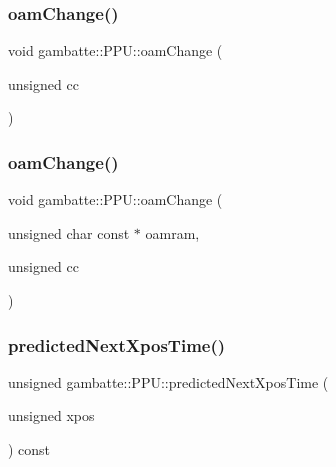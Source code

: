 \subsubsection{\texorpdfstring{oam\+Change()}{oamChange()}\hspace{0.1cm}{\footnotesize\ttfamily [1/2]}}
{\footnotesize\ttfamily void gambatte\+::\+P\+P\+U\+::oam\+Change (\begin{DoxyParamCaption}\item[{unsigned}]{cc }\end{DoxyParamCaption})\hspace{0.3cm}{\ttfamily [inline]}}

\mbox{\label{classgambatte_1_1PPU_a5c1f4b8784c8303e0f3af5bbc27751a5}} 
\subsubsection{\texorpdfstring{oam\+Change()}{oamChange()}\hspace{0.1cm}{\footnotesize\ttfamily [2/2]}}
{\footnotesize\ttfamily void gambatte\+::\+P\+P\+U\+::oam\+Change (\begin{DoxyParamCaption}\item[{unsigned char const $\ast$}]{oamram,  }\item[{unsigned}]{cc }\end{DoxyParamCaption})\hspace{0.3cm}{\ttfamily [inline]}}

\mbox{\label{classgambatte_1_1PPU_ad8d55b06d78e952bed556cf3e51c0b78}} 
\subsubsection{\texorpdfstring{predicted\+Next\+Xpos\+Time()}{predictedNextXposTime()}}
{\footnotesize\ttfamily unsigned gambatte\+::\+P\+P\+U\+::predicted\+Next\+Xpos\+Time (\begin{DoxyParamCaption}\item[{unsigned}]{xpos }\end{DoxyParamCaption}) const}

